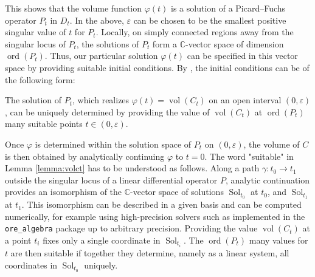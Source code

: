 \documentclass[sigconf, nonacm]{acmart} %
\DeclareMathOperator{\vol}{vol}
\newcommand{\ord}[0]{{\operatorname{ord}}}
\begin{document}
This shows that the volume function $\varphi(t)$ is a solution of a Picard--Fuchs operator $P_t$ in $D_t$. In the above, $\varepsilon$ can be chosen to be the smallest positive singular value of $t$ for $P_t$. Locally, on simply connected regions away from the singular locus of $P_t$, the solutions of $P_t$ form a $\mathbb C$-vector space of dimension $\ord(P_t)$. Thus, our particular solution $\varphi(t)$ can be specified in this vector space by providing suitable initial conditions. By \cite[Lemma 15]{Lairez_volumes_semi_algebraic_sets}, the initial conditions can be of the following form:
\begin{lemma}\label{lemma:volct}
    The solution of $P_t$, which realizes $\varphi(t) = \vol(C_t)$ on an open interval $(0,\varepsilon)$, can be uniquely determined by providing the value of $\vol(C_t)$ at $\ord(P_t)$ many suitable points $t \in (0,\varepsilon)$.
\end{lemma}
Once $\varphi$ is determined within the solution space of $P_t$ on $(0,\varepsilon)$, the volume of $C$ is then obtained by analytically continuing $\varphi$ to $t=0$. The word "suitable" in Lemma \ref{lemma:volct} has to be understood as follows. Along a path $\gamma: t_0 \to t_1$ outside the singular locus of a linear differential operator $P$, analytic continuation provides an isomorphism of the $\mathbb C$-vector space of solutions $\operatorname{Sol}_{t_0}$ at $t_0$, and $\operatorname{Sol}_{t_1}$ at $t_1$. 
This isomorphism can be described in a given basis and can be computed numerically, for example using high-precision solvers such as implemented in the \texttt{ore\_algebra} package \cite{Mezzarobba2016} up to arbitrary precision. Providing the value $\vol(C_t)$ at a point $t_i$ fixes only a single coordinate in $\operatorname{Sol}_{t_i}$. The $\ord(P_t)$ many values for $t$ are then suitable if together they determine, namely as a linear system, all coordinates in $\operatorname{Sol}_{t_0}$ uniquely.
\end{document}
